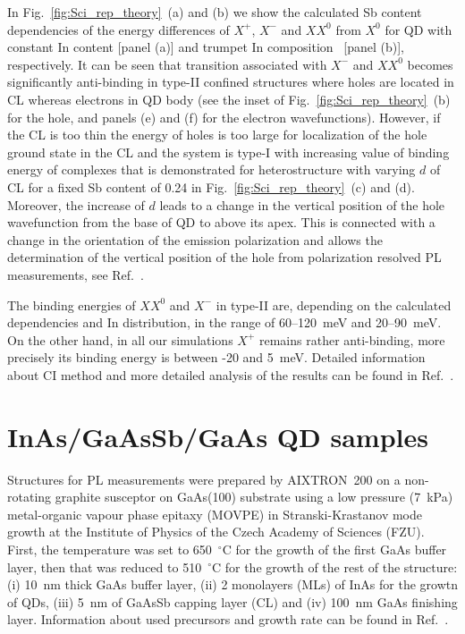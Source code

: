 In Fig.~\ref{fig:Sci_rep_theory}~(a) and (b) we show the calculated Sb content dependencies of the energy differences of $X^+$, $X^-$ and $XX^0$ from $X^0$ for QD with constant In content [panel (a)] and trumpet In composition~\cite{Migliorato} [panel (b)], respectively. It can be seen that transition associated with $X^-$ and $XX^0$ becomes significantly anti-binding in type-II confined structures where holes are located in CL whereas electrons in QD body (see the inset of Fig.~\ref{fig:Sci_rep_theory}~(b) for the hole, and panels (e) and (f) for the electron wavefunctions). However, if the CL is too thin the energy of holes is too large for localization of the hole ground state in the CL and the system is type-I with increasing value of binding energy of complexes that is demonstrated for heterostructure with varying $d$ of CL for a fixed Sb content of 0.24 in Fig.~\ref{fig:Sci_rep_theory}~(c) and (d). Moreover, the increase of $d$ leads to a change in the vertical position of the hole wavefunction from the base of QD to above its apex. This is connected with a change in the orientation of the emission polarization and allows the determination of the vertical position of the hole from polarization resolved PL measurements, see Ref.~\citep{Klenovsky2016}. 

The binding energies of $XX^0$ and $X^-$ in type-II are, depending on the calculated dependencies and In distribution, in the range of 60--120~meV and 20--90~meV. On the other hand, in all our simulations $X^+$ remains rather anti-binding, more precisely its binding energy is between -20 and 5~meV. Detailed information about CI method and more detailed analysis of the results can be found in Ref.~\citep{Klenovsky2017}.


\section{InAs/GaAsSb/GaAs QD samples}

Structures for PL measurements were prepared by AIXTRON~200 on a non-rotating graphite susceptor on GaAs(100) substrate using a low pressure (7~kPa) metal-organic vapour phase epitaxy (MOVPE) in Stranski-Krastanov mode growth at the Institute of Physics of the Czech Academy of Sciences (FZU). First, the temperature was set to 650~$^\circ$C for the growth of the first GaAs buffer layer, then that was reduced to 510~$^\circ$C for the growth of the rest of the structure: (i) 10~nm thick GaAs buffer layer, (ii) 2 monolayers (MLs) of InAs for the growtn of QDs, (iii) 5~nm of GaAsSb capping layer (CL) and (iv) 100~nm GaAs finishing layer. Information about used precursors and growth rate can be found in Ref.~\citep{Klenovsky2016}.

